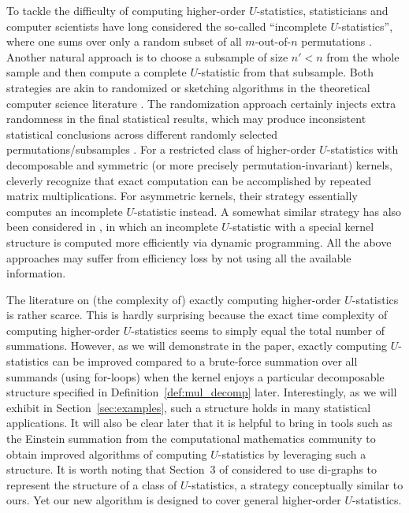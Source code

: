 \documentclass[twoside,11pt]{article}
\begin{document}
To tackle the difficulty of computing higher-order $U$-statistics, statisticians and computer scientists have long considered the so-called ``incomplete $U$-statistics'', where one sums over only a random subset of all $m$-out-of-$n$ permutations \citep{blom1976some, janson1984asymptotic, nowicki1988subgraph, shao2025u}. Another natural approach is to choose a subsample of size $n' < n$ from the whole sample and then compute a complete $U$-statistic from that subsample. Both strategies are akin to randomized or sketching algorithms in the theoretical computer science literature \citep{mahoney2011randomized}. The randomization approach certainly injects extra randomness in the final statistical results, which may produce inconsistent statistical conclusions across different randomly selected permutations/subsamples \citep{guo2025rank}. For a restricted class of higher-order $U$-statistics with decomposable and symmetric (or more precisely permutation-invariant) kernels, \citet{kong2018estimating} cleverly recognize that exact computation can be accomplished by repeated matrix multiplications. For asymmetric kernels, their strategy essentially computes an incomplete $U$-statistic instead. A somewhat similar strategy has also been considered in \citet{zhang2025adaptive}, in which an incomplete $U$-statistic with a special kernel structure is computed more efficiently via dynamic programming. All the above approaches may suffer from efficiency loss by not using all the available information.

The literature on (the complexity of) exactly computing higher-order $U$-statistics is rather scarce. This is hardly surprising because the exact time complexity of computing higher-order $U$-statistics seems to simply equal the total number of summations. However, as we will demonstrate in the paper, exactly computing $U$-statistics can be improved compared to a brute-force summation over all summands (using for-loops) when the kernel enjoys a particular decomposable structure specified in Definition~\ref{def:mul_decomp} later. Interestingly, as we will exhibit in Section~\ref{sec:examples}, such a structure holds in many statistical applications. It will also be clear later that it is helpful to bring in tools such as the Einstein summation from the computational mathematics community to obtain improved algorithms of computing $U$-statistics by leveraging such a structure. It is worth noting that Section~3 of \citet{liu2024hypothesis} considered to use di-graphs to represent the structure of a class of $U$-statistics, a strategy conceptually similar to ours. Yet our new algorithm is designed to cover general higher-order $U$-statistics.
\end{document}
